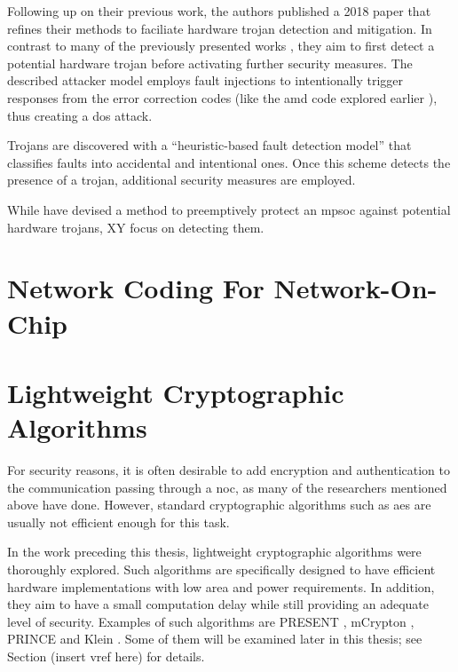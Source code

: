Following up on their previous work, the authors published a 2018 paper \cite{boraten18mitigationdos} that refines their methods to faciliate hardware
trojan detection and mitigation. In contrast to many of the previously presented works \cites(e.g.)(){ancajas14fortnocs}{frey17hardenednoc}, they aim
to first detect a potential hardware trojan before activating further security measures. The described attacker model employs fault injections to
intentionally trigger responses from the error correction codes (like the \gls{amd} code explored earlier \cite{boraten16packetsecurity}), thus
creating a \gls{dos} attack.

Trojans are discovered with a \enquote{heuristic-based fault detection model} \cite[25]{boraten18mitigationdos} that classifies faults into accidental
and intentional ones. Once this scheme detects the presence of a trojan, additional security measures are employed. %

While \citeauthor{ancajas14fortnocs} have devised a method to preemptively protect an \gls{mpsoc} against potential hardware trojans, XY focus on
detecting them.

\section{Network Coding For Network-On-Chip}

\section{Lightweight Cryptographic Algorithms}\label{sec:lightweightcrypto}
For security reasons, it is often desirable to add encryption and authentication to the communication passing through a \gls{noc}, as many of the
researchers mentioned above have done. However,
standard cryptographic algorithms such as \gls{aes} are usually not efficient enough for this task. \cite[1]{bogdanov07present}

In the work preceding this thesis, lightweight cryptographic algorithms were thoroughly explored. \cite{harttung17lightweightcrypto} Such
algorithms are
specifically designed to have efficient hardware implementations with low area and power requirements. In addition, they aim to have a small
computation delay while still providing an adequate level of security. Examples of such algorithms are PRESENT \cite{bogdanov07present},
mCrypton \cite{lim06mcrypton}, PRINCE \cite{borghoff12prince} and Klein \cite{gong12klein}. Some of them will be examined later in this
thesis; see Section (insert vref here) for details. %

